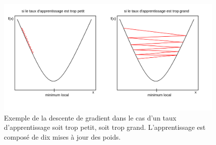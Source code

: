 \begin{figure}[h]
  \centering
  \includegraphics[width=.95\textwidth]{./Chapitre2/figures/tauxApprentissage.png}
  \caption{Exemple de la descente de gradient dans le cas d'un taux d'apprentissage soit trop petit, soit trop grand. L'apprentissage est composé de dix mises à jour des poids.}
  \label{fig:tauxApprentissage}
\end{figure}
